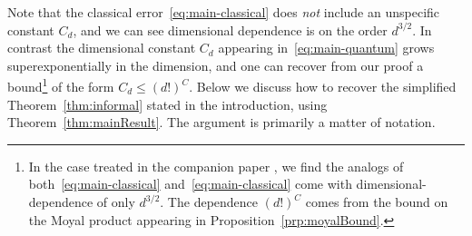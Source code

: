 \documentclass{article}
\numberwithin{equation}{section}
\begin{document}
Note that the classical error~\eqref{eq:main-classical} does \emph{not} include an unspecific constant $C_d$, and we can see  dimensional dependence is on the order $d^{3/2}$.  In contrast the dimensional constant $C_d$ appearing in~\eqref{eq:main-quantum} grows superexponentially in the dimension, and one can recover from our proof a bound\footnote{In the case treated in the companion paper \cite{hernandez2023decoherence1}, we find the analogs of both~\eqref{eq:main-classical} and~\eqref{eq:main-classical} come with dimensional-dependence of only $d^{3/2}$.  The dependence $(d!)^C$ comes from the bound on the Moyal product appearing in Proposition~\ref{prp:moyalBound}.} of the form 
$C_d \leq (d!)^C$.
Below we discuss how to recover the simplified Theorem~\ref{thm:informal} stated in the introduction, using Theorem~\ref{thm:mainResult}.  The argument is primarily a matter of notation.  
\end{document}
